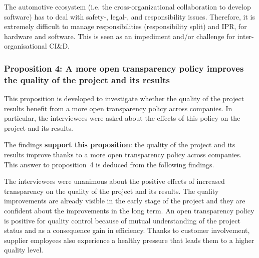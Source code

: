  The automotive %
ecosystem %
{(i.e. the cross-organizational collaboration to develop software)} has to deal with safety-, legal-, and responsibility issues. Therefore, it is extremely difficult to manage responsibilities (responsibility split) and IPR, for hardware and software. This is seen as an impediment and/or challenge for inter-organisational CI\&D.

\subsubsection{Proposition 4: A more open transparency policy improves the quality of the project and its results}

%
%
%

This proposition is developed to investigate whether the quality of the project results benefit from a more open transparency policy across companies. In particular, the interviewees were asked about the effects of this policy on the project and its results.

The findings {\bf support this proposition}:  the quality of the project and its results improve thanks to a more open transparency policy across companies. This answer to proposition~4 is deduced from the following findings.

 The interviewees were unanimous about the positive effects of increased transparency on the quality of the project and its results. The quality improvements are already visible in the early stage of the project and they are confident about the improvements in the long term. An open transparency policy is positive for quality control because of mutual understanding of the project status and as a consequence gain in efficiency. Thanks to customer involvement, supplier employees also experience a healthy pressure that leads them to a higher quality level.

